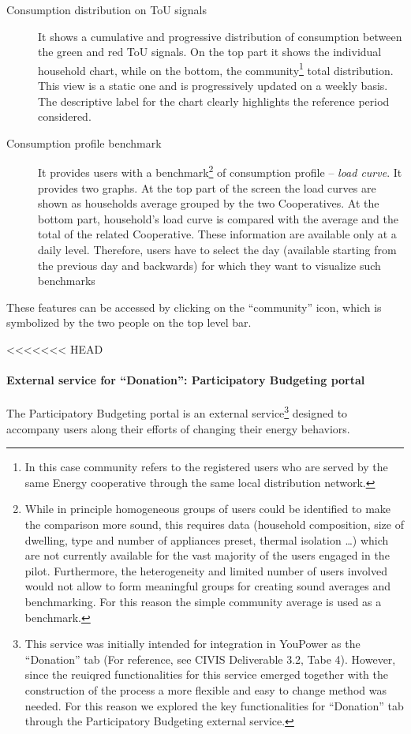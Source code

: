 \begin{description}
 \item[Consumption distribution on ToU signals] It shows a cumulative and progressive distribution of consumption between the green and red ToU signals.
 On the top part it shows the individual household chart, while on the bottom, the community\footnote{In this case community refers to the registered users who 
 are served by the same Energy cooperative through the same local distribution network.} total distribution. This view is a static one and is progressively updated on a weekly basis. The descriptive label for the chart clearly highlights the reference period considered.
 \item[Consumption profile benchmark] It provides users with a benchmark\footnote{While in principle homogeneous groups of users could be identified to make the comparison more sound, this requires data (household composition, size of dwelling, type and number of appliances preset, thermal isolation \ldots) which are not currently available for the vast majority of the users engaged in the pilot.
 Furthermore, the heterogeneity and limited number of users involved would not allow to form meaningful groups for creating sound averages and benchmarking. For this reason the simple community average is used as a benchmark.} of consumption profile -- \textit{load curve}.
 It provides two graphs. At the top part of the screen the load curves are shown as households average grouped by the two Cooperatives.
 At the bottom part, household's load curve is compared with the average and the total of the related Cooperative. These information are available only at a daily level. Therefore, users have to select the day (available starting from the previous day and backwards) for which they want to visualize such benchmarks
\end{description}
These features can be accessed by clicking on the ``community'' icon, which is symbolized by the two people on the top level bar.


<<<<<<< HEAD
\paragraph{External service for ``Donation'': Participatory Budgeting portal} 

The Participatory Budgeting portal is an external service\footnote{This service was initially intended for integration in YouPower as the ``Donation'' tab
(For reference, see CIVIS Deliverable 3.2, Tabe 4). However, since the reuiqred functionalities for this service emerged together with the construction of the process a more flexible
and easy to change method was needed. For this reason we explored the key functionalities for ``Donation'' tab through the Participatory Budgeting external service.}
designed to accompany users along their efforts of changing their energy behaviors.

